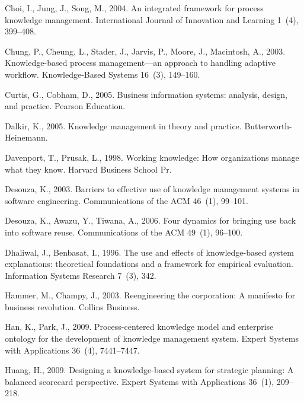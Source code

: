 \documentclass{elsarticle}
\begin{document}
{\begin{thebibliography}{37}
Choi, I., Jung, J., Song, M., 2004. {An integrated framework for process
  knowledge management}. International Journal of Innovation and Learning
  1~(4), 399--408.

Chung, P., Cheung, L., Stader, J., Jarvis, P., Moore, J., Macintosh, A., 2003.
  {Knowledge-based process management—an approach to handling adaptive
  workflow}. Knowledge-Based Systems 16~(3), 149--160.

Curtis, G., Cobham, D., 2005. {Business information systems: analysis, design,
  and practice}. Pearson Education.

Dalkir, K., 2005. {Knowledge management in theory and practice}.
  Butterworth-Heinemann.

Davenport, T., Prusak, L., 1998. {Working knowledge: How organizations manage
  what they know}. Harvard Business School Pr.

Desouza, K., 2003. {Barriers to effective use of knowledge management systems
  in software engineering}. Communications of the ACM 46~(1), 99--101.

Desouza, K., Awazu, Y., Tiwana, A., 2006. {Four dynamics for bringing use back
  into software reuse}. Communications of the ACM 49~(1), 96--100.

Dhaliwal, J., Benbasat, I., 1996. {The use and effects of knowledge-based
  system explanations: theoretical foundations and a framework for empirical
  evaluation}. Information Systems Research 7~(3), 342.

Hammer, M., Champy, J., 2003. {Reengineering the corporation: A manifesto for
  business revolution}. Collins Business.

Han, K., Park, J., 2009. {Process-centered knowledge model and enterprise
  ontology for the development of knowledge management system}. Expert Systems
  with Applications 36~(4), 7441--7447.

Huang, H., 2009. {Designing a knowledge-based system for strategic planning: A
  balanced scorecard perspective}. Expert Systems with Applications 36~(1),
  209--218.


\end{thebibliography}}
\end{document}
